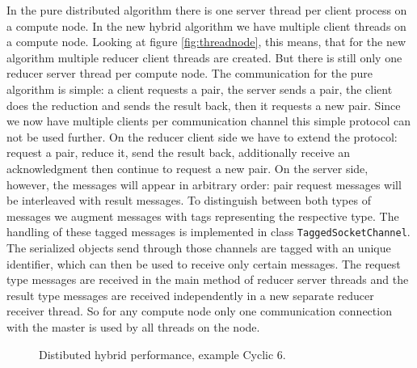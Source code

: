 \documentclass[10pt,twocolumn,a4paper]{article}
\newcommand{\code}[1]{\texttt{#1}}
\begin{document}
In the pure distributed algorithm there is one server thread per
client process on a compute node. In the new hybrid algorithm we have
multiple client threads on a compute node. Looking at figure
\ref{fig:threadnode}, this means, that for the new algorithm multiple
reducer client threads are created.  But there is still only one
reducer server thread per compute node.  The communication for the
pure algorithm is simple: a client requests a pair, the server sends
a pair, the client does the reduction and sends the result back, then
it requests a new pair. Since we now have multiple clients per
communication channel this simple protocol can not be used further. On
the reducer client side we have to extend the protocol: request a
pair, reduce it, send the result back, additionally receive an
acknowledgment then continue to request a new pair.  On the server
side, however, the messages will appear in arbitrary order: pair
request messages will be interleaved with result messages.  To
distinguish between both types of messages we augment messages with
tags representing the respective type. The handling of these tagged
messages is implemented in class \code{Tagged\-Socket\-Channel}.  The
serialized objects send through those channels are tagged with an
unique identifier, which can then be used to receive only certain
messages. The request type messages are received in the main method of
reducer server threads and the result type messages are received
independently in a new separate reducer receiver thread.  So for any
compute node only one communication connection with the master is used
by all threads on the node.

\begin{figure}[thb]
\centering
{}
\caption{Distibuted hybrid performance, example Cyclic 6.}
\label{fig:c61hybrid}
\end{figure}
\end{document}
